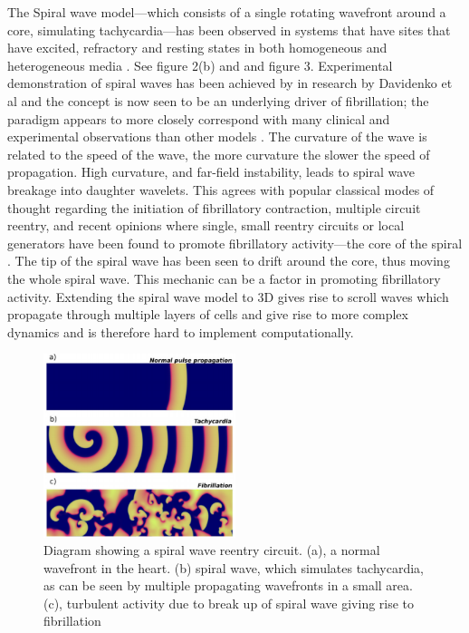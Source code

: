 \documentclass[twocolumn]{article}
\begin{document}
The Spiral wave model---which consists of a single rotating wavefront around a core, simulating tachycardia---has been observed in systems that have sites that have excited, refractory and resting states in both homogeneous and heterogeneous media \cite{Greenburg} \cite{Bub}. See figure 2(b) and and figure 3. %
 Experimental demonstration of spiral waves has been achieved by in research by Davidenko et al and the concept is now seen to be an underlying driver of fibrillation; the paradigm appears to more closely correspond with many clinical and experimental observations than other models \cite{Davidenko} \cite{Comtois}. The curvature of the wave is related to the speed of the wave, the more curvature the slower the speed of propagation. High curvature, and  far-field instability, leads to spiral wave breakage into daughter wavelets. This agrees with popular classical modes of thought regarding the initiation of fibrillatory contraction, multiple circuit reentry, and recent opinions where single, small reentry circuits or local generators have been found to promote fibrillatory activity---the core of the spiral \cite{Skanes} \cite{Nattel2}. The tip of the spiral wave has been seen to drift around the core, thus moving the whole spiral wave. This mechanic can be a factor in promoting fibrillatory activity.
 Extending the spiral wave model to 3D gives rise to scroll waves which propagate through multiple layers of cells and give rise to more complex dynamics and is therefore hard to implement computationally.  %


\begin{figure}
\caption[short title]{Diagram showing a spiral wave reentry circuit. (a), a normal wavefront in the heart. (b) spiral wave, which simulates tachycardia, as can be seen by multiple propagating wavefronts in a small area. (c), turbulent activity due to break up of spiral wave giving rise to fibrillation \cite{Alonso}}
\centering
\includegraphics[width = 0.5\textwidth]{spiralbreak2tachy}
\end{figure}
\end{document}
